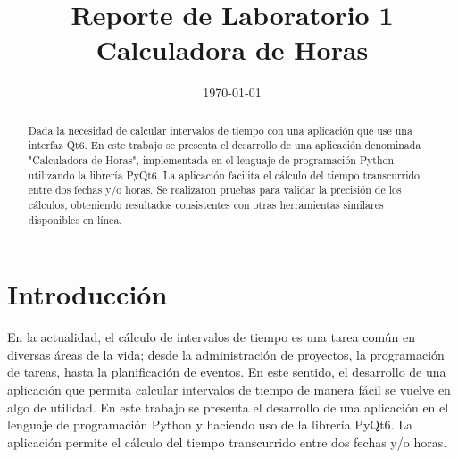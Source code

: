 \documentclass[conference]{IEEEtran}
\date{\specialdate\today}
\begin{document}
\newcommand{\breite}{0.9} %
\newcommand{\RelacionFiguradoscolumnas}{0.9}
\newcommand{\RelacionFiguradoscolumnasPuntoCinco}{0.45}

\title{Reporte de Laboratorio 1 \\ Calculadora de Horas}

\author{
}

\maketitle

\begin{abstract} 
    Dada la necesidad de calcular intervalos de tiempo con una aplicación que use una interfaz Qt6. En este trabajo se presenta el desarrollo de una aplicación denominada "Calculadora de Horas", implementada en el lenguaje de programación Python utilizando la librería PyQt6. La aplicación facilita el cálculo del tiempo transcurrido entre dos fechas y/o horas. Se realizaron pruebas para validar la precisión de los cálculos, obteniendo resultados consistentes con otras herramientas similares disponibles en línea\cite{calculator}.
\end{abstract}

\section{Introducción}
    En la actualidad, el cálculo de intervalos de tiempo es una tarea común en diversas áreas de la vida; desde la administración de proyectos, la programación de tareas, hasta la planificación de eventos. En este sentido, el desarrollo de una aplicación que permita calcular intervalos de tiempo de manera fácil se vuelve en algo de utilidad. En este trabajo se presenta el desarrollo de una aplicación en el lenguaje de programación Python\cite{python} y haciendo uso de la librería PyQt6\cite{qt6}. La aplicación permite el cálculo del tiempo transcurrido entre dos fechas y/o horas.
\end{document}
